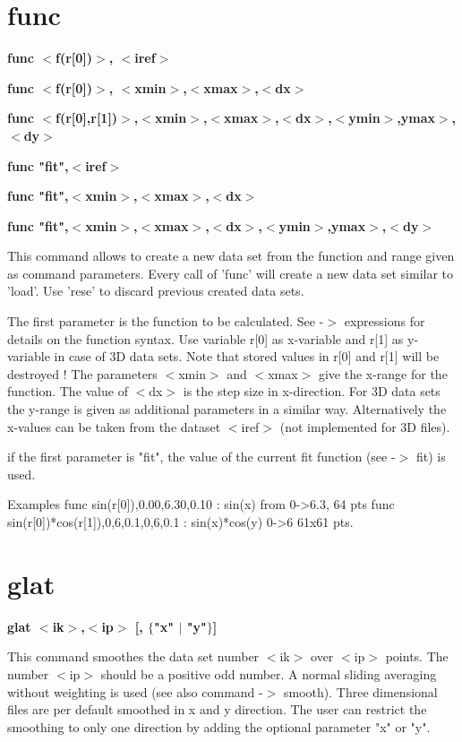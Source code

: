 \section{func}
{\bf func $ <$f(r[0])$> $,     $ <$iref$> $ \par }
{\bf func $ <$f(r[0])$> $,     $ <$xmin$> $,$ <$xmax$> $,$ <$dx$> $ \par }
{\bf func $ <$f(r[0],r[1])$> $,$ <$xmin$> $,$ <$xmax$> $,$ <$dx$> $,$ <$ymin$> $,ymax$> $,$ <$dy$> $ \par }
{\bf func "fit",$ <$iref$> $ \par }
{\bf func "fit",$ <$xmin$> $,$ <$xmax$> $,$ <$dx$> $ \par }
{\bf func "fit",$ <$xmin$> $,$ <$xmax$> $,$ <$dx$> $,$ <$ymin$> $,ymax$> $,$ <$dy$> $ \par }
\par
\vspace{3pt}
This command allows to create a new data set from the function and 
range given as command parameters. Every call of 'func' will create 
a new data set similar to 'load'. Use 'rese' to discard previous 
created data sets. 
\par
The first parameter is the function to be calculated. See -$> $ expressions 
for details on the function syntax. Use variable r[0] as x-variable and 
r[1] as y-variable in case of 3D data sets. Note that stored values 
in r[0] and r[1] will be destroyed ! The parameters $ <$xmin$> $ and $ <$xmax$> $ 
give the x-range for the function. The value of $ <$dx$> $ is the step size 
in x-direction. For 3D data sets the y-range is given as additional 
parameters in a similar way. Alternatively the x-values can be taken 
from the dataset $ <$iref$> $ (not implemented for 3D files). 
\par
if the first parameter is "fit", the value of the current fit function 
(see -$> $ fit) is used. 
\par
\begin{MacVerbatim}
Examples
func sin(r[0]),0.00,6.30,0.10             : sin(x) from 0->6.3, 64 pts
func sin(r[0])*cos(r[1]),0,6,0.1,0,6,0.1  : sin(x)*cos(y) 0->6  61x61 pts.
\end{MacVerbatim}
\section{glat}
{\bf glat $ <$ik$> $,$ <$ip$> $ [, $ \{$"x" $| $ "y"$\} $] \par }
\par
\vspace{3pt}
This command smoothes the data set number $ <$ik$> $ over $ <$ip$> $ points. 
The number $ <$ip$> $ should be a positive odd number. A normal sliding 
averaging without weighting is used (see also command -$> $ smooth). 
Three dimensional files are per default smoothed in x and y direction. 
The user can restrict the smoothing to only one direction by adding the 
optional parameter "x" or "y". 
